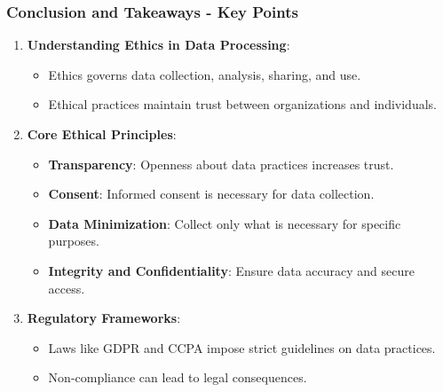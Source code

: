 \documentclass[aspectratio=169]{beamer}
\begin{document}
\begin{frame}[fragile]
    \frametitle{Conclusion and Takeaways - Key Points}
    \begin{enumerate}
        \item \textbf{Understanding Ethics in Data Processing}:
        \begin{itemize}
            \item Ethics governs data collection, analysis, sharing, and use.
            \item Ethical practices maintain trust between organizations and individuals.
        \end{itemize}

        \item \textbf{Core Ethical Principles}:
        \begin{itemize}
            \item \textbf{Transparency}: Openness about data practices increases trust.
            \item \textbf{Consent}: Informed consent is necessary for data collection.
            \item \textbf{Data Minimization}: Collect only what is necessary for specific purposes.
            \item \textbf{Integrity and Confidentiality}: Ensure data accuracy and secure access.
        \end{itemize}

        \item \textbf{Regulatory Frameworks}:
        \begin{itemize}
            \item Laws like GDPR and CCPA impose strict guidelines on data practices.
            \item Non-compliance can lead to legal consequences.
        \end{itemize}
    \end{enumerate}
\end{frame}
\end{document}
